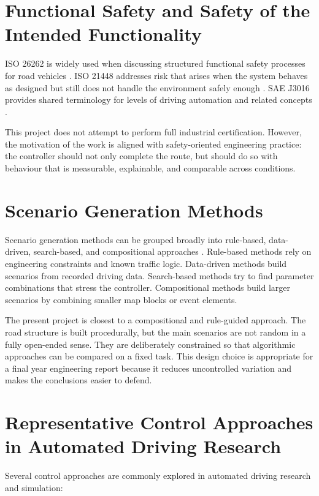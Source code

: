 \documentclass[12pt,a4paper]{report}
\begin{document}
\section{Functional Safety and Safety of the Intended Functionality}
ISO 26262 is widely used when discussing structured functional safety processes for road vehicles \cite{iso26262}. ISO 21448 addresses risk that arises when the system behaves as designed but still does not handle the environment safely enough \cite{iso21448}. SAE J3016 provides shared terminology for levels of driving automation and related concepts \cite{sae3016}.

This project does not attempt to perform full industrial certification. However, the motivation of the work is aligned with safety-oriented engineering practice: the controller should not only complete the route, but should do so with behaviour that is measurable, explainable, and comparable across conditions.

\section{Scenario Generation Methods}
Scenario generation methods can be grouped broadly into rule-based, data-driven, search-based, and compositional approaches \cite{wang2024scenario,song2023critical,openscenario_standard}. Rule-based methods rely on engineering constraints and known traffic logic. Data-driven methods build scenarios from recorded driving data. Search-based methods try to find parameter combinations that stress the controller. Compositional methods build larger scenarios by combining smaller map blocks or event elements.

The present project is closest to a compositional and rule-guided approach. The road structure is built procedurally, but the main scenarios are not random in a fully open-ended sense. They are deliberately constrained so that algorithmic approaches can be compared on a fixed task. This design choice is appropriate for a final year engineering report because it reduces uncontrolled variation and makes the conclusions easier to defend.

\section{Representative Control Approaches in Automated Driving Research}
Several control approaches are commonly explored in automated driving research and simulation:
\end{document}
